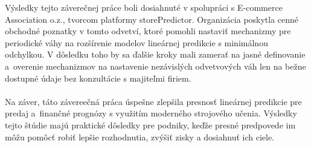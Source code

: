     Výsledky tejto záverečnej práce boli dosiahnuté v spolupráci s E-commerce
    Association o.z., tvorcom platformy storePredictor. Organizácia poskytla cenné obchodné
    poznatky v tomto odvetví, ktoré pomohli nastaviť mechanizmy
    pre periodické váhy na rozšírenie modelov lineárnej predikcie s minimálnou odchylkou.
    V dôsledku toho by sa ďalšie kroky mali zamerať na jasné definovanie a~overenie
    mechanizmov na nastavenie nezávislých odvetvových váh len na bežne dostupné údaje
    bez konzultácie s majiteľmi firiem.\\
    \\
    Na záver, táto závereečná práca úspešne zlepšila presnosť lineárnej predikcie pre predaj a~finančné
    prognózy s využitím moderného strojového učenia. Výsledky tejto štúdie majú praktické
    dôsledky pre podniky, keďže presné predpovede im môžu pomôcť robiť lepšie rozhodnutia,
    zvýšiť zisky a dosiahnuť ich ciele.
